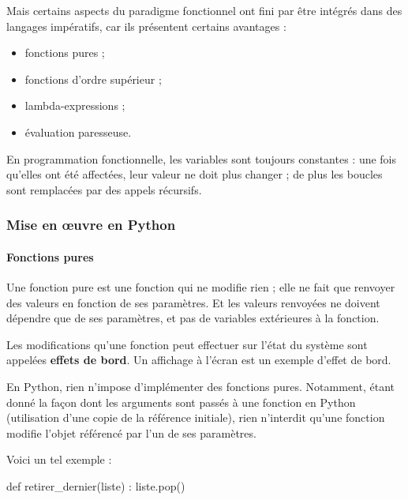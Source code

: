 \documentclass[
  a4paper,
  DIV=11,
  numbers=noendperiod]{scrartcl}
\let\oldparagraph\paragraph
\renewcommand{\paragraph}[1]{\oldparagraph{#1}\mbox{}}
\newenvironment{Shaded}{\begin{snugshade}}{\end{snugshade}}
\newcommand{\KeywordTok}[1]{\textcolor[rgb]{0.00,0.23,0.31}{#1}}
\newcommand{\NormalTok}[1]{\textcolor[rgb]{0.00,0.23,0.31}{#1}}
\providecommand{\tightlist}{%
  \setlength{\itemsep}{0pt}\setlength{\parskip}{0pt}}\usepackage{longtable,booktabs,array}
\begin{document}
Mais certains aspects du paradigme fonctionnel ont fini par être
intégrés dans des langages impératifs, car ils présentent certains
avantages :

\begin{itemize}
\tightlist
\item
  fonctions pures ;
\item
  fonctions d'ordre supérieur ;
\item
  lambda-expressions ;
\item
  évaluation paresseuse.
\end{itemize}

En programmation fonctionnelle, les variables sont toujours constantes :
une fois qu'elles ont été affectées, leur valeur ne doit plus changer ;
de plus les boucles sont remplacées par des appels récursifs.

\hypertarget{mise-en-ux153uvre-en-python}{%
\subsubsection{Mise en œuvre en
Python}\label{mise-en-ux153uvre-en-python}}

\hypertarget{fonctions-pures}{%
\paragraph{Fonctions pures}\label{fonctions-pures}}

Une fonction pure est une fonction qui ne modifie rien ; elle ne fait
que renvoyer des valeurs en fonction de ses paramètres. Et les valeurs
renvoyées ne doivent dépendre que de ses paramètres, et pas de variables
extérieures à la fonction.

Les modifications qu'une fonction peut effectuer sur l'état du système
sont appelées \textbf{effets de bord}. Un affichage à l'écran est un
exemple d'effet de bord.

En Python, rien n'impose d'implémenter des fonctions pures. Notamment,
étant donné la façon dont les arguments sont passés à une fonction en
Python (utilisation d'une copie de la référence initiale), rien
n'interdit qu'une fonction modifie l'objet référencé par l'un de ses
paramètres.

Voici un tel exemple :

\begin{Shaded}
\begin{Highlighting}[]
\KeywordTok{def}\NormalTok{ retirer\_dernier(liste) :}
\NormalTok{    liste.pop()}
\end{Highlighting}
\end{Shaded}
\end{document}
